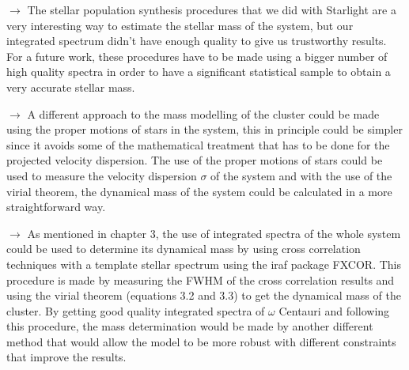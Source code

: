 $\rightarrow$ The stellar population synthesis procedures that we did with Starlight are a very interesting way to estimate the stellar mass of the system, but our integrated spectrum didn't have enough quality to give us trustworthy results. For a future work, these procedures have to be made using a bigger number of high quality spectra in order to have a significant statistical sample to obtain a very accurate stellar mass.

$\rightarrow$ A different approach to the mass modelling of the cluster could be made using the proper motions of stars in the system, this in principle could be simpler since it avoids some of the mathematical treatment that has to be done for the projected velocity dispersion. The use of the proper motions of stars could be used to measure the velocity dispersion $\sigma$ of the system and with the use of the virial theorem, the dynamical mass of the system could be calculated in a more straightforward way.

$\rightarrow$ As mentioned in chapter 3, the use of integrated spectra of the whole system could be used to determine its dynamical mass by using cross correlation techniques with a template stellar spectrum using the iraf package FXCOR. This procedure is made by measuring the FWHM of the cross correlation results and using the virial theorem (equations 3.2 and 3.3) to get the dynamical mass of the cluster. By getting good quality integrated spectra of $\omega$ Centauri and following this procedure, the mass determination would be made by another different method that would allow the model to be more robust with different constraints that improve the results.

